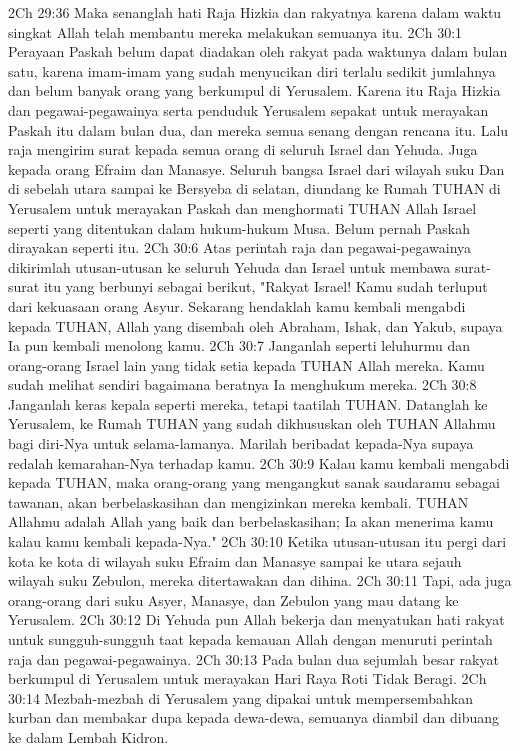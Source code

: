 2Ch 29:36  Maka senanglah hati Raja Hizkia dan rakyatnya karena dalam waktu singkat Allah telah membantu mereka melakukan semuanya itu.
2Ch 30:1  Perayaan Paskah belum dapat diadakan oleh rakyat pada waktunya dalam bulan satu, karena imam-imam yang sudah menyucikan diri terlalu sedikit jumlahnya dan belum banyak orang yang berkumpul di Yerusalem. Karena itu Raja Hizkia dan pegawai-pegawainya serta penduduk Yerusalem sepakat untuk merayakan Paskah itu dalam bulan dua, dan mereka semua senang dengan rencana itu. Lalu raja mengirim surat kepada semua orang di seluruh Israel dan Yehuda. Juga kepada orang Efraim dan Manasye. Seluruh bangsa Israel dari wilayah suku Dan di sebelah utara sampai ke Bersyeba di selatan, diundang ke Rumah TUHAN di Yerusalem untuk merayakan Paskah dan menghormati TUHAN Allah Israel seperti yang ditentukan dalam hukum-hukum Musa. Belum pernah Paskah dirayakan seperti itu.
2Ch 30:6  Atas perintah raja dan pegawai-pegawainya dikirimlah utusan-utusan ke seluruh Yehuda dan Israel untuk membawa surat-surat itu yang berbunyi sebagai berikut, "Rakyat Israel! Kamu sudah terluput dari kekuasaan orang Asyur. Sekarang hendaklah kamu kembali mengabdi kepada TUHAN, Allah yang disembah oleh Abraham, Ishak, dan Yakub, supaya Ia pun kembali menolong kamu.
2Ch 30:7  Janganlah seperti leluhurmu dan orang-orang Israel lain yang tidak setia kepada TUHAN Allah mereka. Kamu sudah melihat sendiri bagaimana beratnya Ia menghukum mereka.
2Ch 30:8  Janganlah keras kepala seperti mereka, tetapi taatilah TUHAN. Datanglah ke Yerusalem, ke Rumah TUHAN yang sudah dikhususkan oleh TUHAN Allahmu bagi diri-Nya untuk selama-lamanya. Marilah beribadat kepada-Nya supaya redalah kemarahan-Nya terhadap kamu.
2Ch 30:9  Kalau kamu kembali mengabdi kepada TUHAN, maka orang-orang yang mengangkut sanak saudaramu sebagai tawanan, akan berbelaskasihan dan mengizinkan mereka kembali. TUHAN Allahmu adalah Allah yang baik dan berbelaskasihan; Ia akan menerima kamu kalau kamu kembali kepada-Nya."
2Ch 30:10  Ketika utusan-utusan itu pergi dari kota ke kota di wilayah suku Efraim dan Manasye sampai ke utara sejauh wilayah suku Zebulon, mereka ditertawakan dan dihina.
2Ch 30:11  Tapi, ada juga orang-orang dari suku Asyer, Manasye, dan Zebulon yang mau datang ke Yerusalem.
2Ch 30:12  Di Yehuda pun Allah bekerja dan menyatukan hati rakyat untuk sungguh-sungguh taat kepada kemauan Allah dengan menuruti perintah raja dan pegawai-pegawainya.
2Ch 30:13  Pada bulan dua sejumlah besar rakyat berkumpul di Yerusalem untuk merayakan Hari Raya Roti Tidak Beragi.
2Ch 30:14  Mezbah-mezbah di Yerusalem yang dipakai untuk mempersembahkan kurban dan membakar dupa kepada dewa-dewa, semuanya diambil dan dibuang ke dalam Lembah Kidron.

